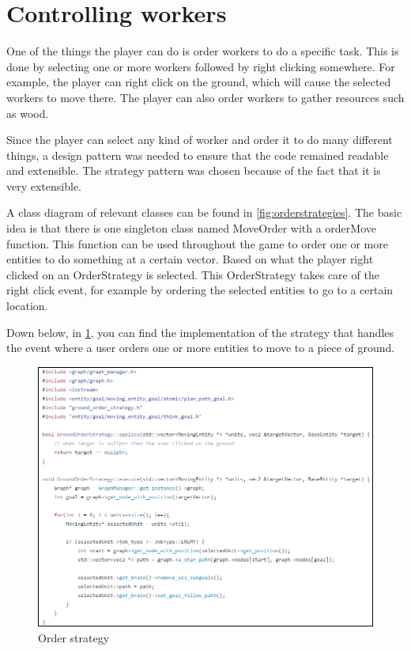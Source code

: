 \section{Controlling workers}

One of the things the player can do is order workers to do a specific task. This is done by selecting one or more workers followed by right clicking somewhere. For example, the player can right click on the ground, which will cause the selected workers to move there. The player can also order workers to gather resources such as wood.

Since the player can select any kind of worker and order it to do many different things, a design pattern was needed to ensure that the code remained readable and extensible. The strategy pattern was chosen because of the fact that it is very extensible. 

A class diagram of relevant classes can be found in \cref{fig:orderstrategies}. The basic idea is that there is one singleton class named MoveOrder with a orderMove function. This function can be used throughout the game to order one or more entities to do something at a certain vector. Based on what the player right clicked on an OrderStrategy is selected. This OrderStrategy takes care of the right click event, for example by ordering the selected entities to go to a certain location.

Down below, in \cref{fig:orderstrategy}, you can find the implementation of the strategy that handles the event where a user orders one or more entities to move to a piece of ground.

\begin{figure}[!htb]
    \centering
    \includegraphics[angle=0,origin=c,scale=0.66]
    {images/order-strategy.PNG}
    \caption{Order strategy}\label{fig:orderstrategy}
\end{figure}

